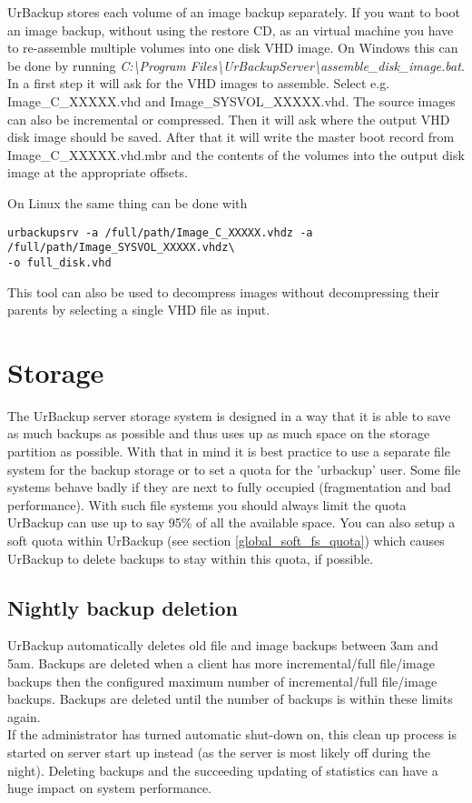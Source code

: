 \documentclass[a4paper,10pt]{article}
\begin{document}
UrBackup stores each volume of an image backup separately. If you want to boot an image backup, without using
the restore CD, as an virtual machine you have to re-assemble multiple volumes into one disk VHD image. On Windows
this can be done by running \textsl{C:\textbackslash Program Files\textbackslash UrBackupServer\textbackslash assemble\_disk\_image.bat}.
In a first step it will ask for the VHD images to assemble. Select e.g. Image\_C\_XXXXX.vhd and Image\_SYSVOL\_XXXXX.vhd. The source images can also be incremental or compressed. Then it will ask where the output VHD disk image should be saved. After that it will write the master boot record from Image\_C\_XXXXX.vhd.mbr and the contents of the volumes into the output disk image at the appropriate offsets.


\noindent On Linux the same thing can be done with
\begin{verbatim}
urbackupsrv -a /full/path/Image_C_XXXXX.vhdz -a /full/path/Image_SYSVOL_XXXXX.vhdz\ 
-o full_disk.vhd
\end{verbatim}

\noindent This tool can also be used to decompress images without decompressing their parents by selecting a single VHD file as input.

\section{Storage}

The UrBackup server storage system is designed in a way that it is able to save
as much backups as possible and thus uses up as much space on the storage
partition as possible. With that in mind it is best practice to use a separate
file system for the backup storage or to set a quota for the 'urbackup' user.
Some file systems behave badly if they are next to fully occupied (fragmentation
and bad performance). With such file systems you should always limit the quota
UrBackup can use up to say 95\% of all the available space. You can also setup
a soft quota within UrBackup (see section \ref{global_soft_fs_quota}) which
causes UrBackup to delete backups to stay within this quota, if possible.

\subsection{Nightly backup deletion}

UrBackup automatically deletes old file and image backups between 3am and 5am. Backups are deleted when a client has more incremental/full file/image backups then the configured maximum number of incremental/full file/image backups. Backups are deleted until the number of backups is within these limits again.\\
If the administrator has turned automatic shut-down on, this clean up process is started on server start up instead (as the server is most likely off during the night). Deleting backups and the succeeding updating of statistics can have a huge impact on system performance.
\end{document}
